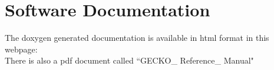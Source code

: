\section{Software Documentation}
The doxygen generated documentation is available in html format in this webpage: 
\\
There is also a pdf document called ``GECKO\_ Reference\_ Manual"
\newpage
